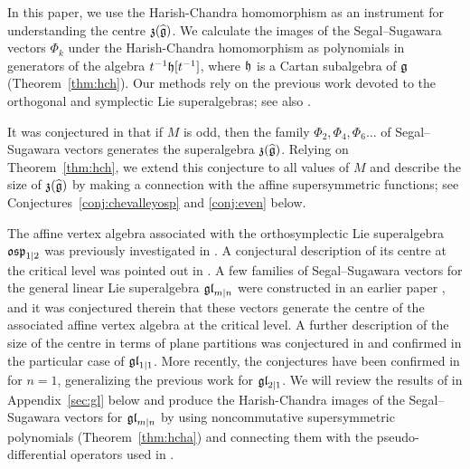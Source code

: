 \documentclass[12pt]{article}
\begin{document}
In this paper, we use the Harish-Chandra homomorphism as
an instrument for understanding the centre $\mathfrak{z}(\widehat{\mathfrak{g}})$.
We calculate the images of the Segal--Sugawara vectors $\Phi_k$
under the Harish-Chandra
homomorphism as polynomials in generators of the algebra $t^{-1}\mathfrak h[t^{-1}]$,
where $\mathfrak h$ is a Cartan subalgebra of $\mathfrak{g}$ (Theorem~\ref{thm:hch}).
Our methods rely on the previous work \cite{mm:yc}
devoted to the orthogonal and symplectic Lie superalgebras; see also \cite{m:so}.

It was conjectured in \cite[Conjecture~2.3]{mn:ss} that if $M$ is odd, then the family $\Phi_2,\Phi_4,\Phi_6\dots$
of Segal--Sugawara vectors generates the superalgebra $\mathfrak{z}(\widehat{\mathfrak{g}})$.
Relying on Theorem~\ref{thm:hch},
we extend this conjecture to all values of $M$ and describe the size
of $\mathfrak{z}(\widehat{\mathfrak{g}})$ by making a connection with the affine supersymmetric functions;
see Conjectures~\ref{conj:chevalleyosp}
and \ref{conj:even} below.

The affine vertex algebra associated with the orthosymplectic
Lie superalgebra $\mathfrak{osp}_{1|2}$
was previously investigated in \cite{a:rs}.
A conjectural description of its centre at the critical level
was pointed out in \cite[Remark~10]{a:rs}.
A few families of Segal--Sugawara vectors for the general linear Lie superalgebra
$\mathfrak{gl}_{m|n}$ were constructed in an earlier paper \cite{mr:mm}, and it was conjectured therein that
these vectors generate the centre of the associated
affine vertex algebra at the critical level. A further description of the size of the
centre in terms of plane partitions was conjectured in \cite{mm:iv} and confirmed in the
particular case of $\mathfrak{gl}_{1|1}$. More recently, the conjectures have been confirmed
in \cite{afn:ca} for $n=1$, generalizing the previous work \cite{an:ca} for $\mathfrak{gl}_{2|1}$.
We will review the results of \cite{mr:mm} in Appendix~\ref{sec:gl} below and
produce the Harish-Chandra images of the Segal--Sugawara vectors for
$\mathfrak{gl}_{m|n}$ by using noncommutative supersymmetric polynomials (Theorem~\ref{thm:hcha})
and connecting them with the pseudo-differential operators used in \cite{afn:ca}.
\end{document}
